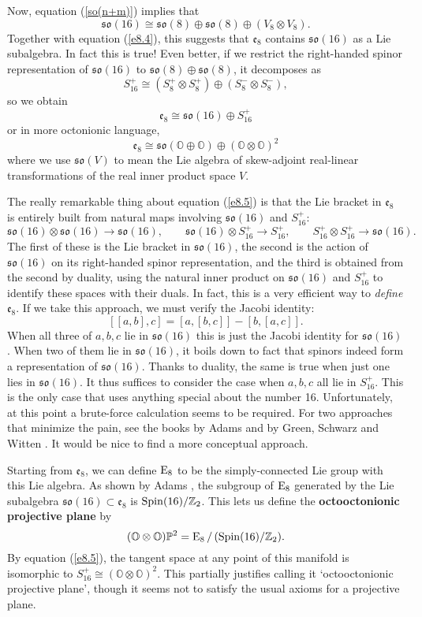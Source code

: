 \documentclass[12pt]{article}
\newcommand\Z{{\mathbb Z}}
\renewcommand\O{{\mathbb O}}
\renewcommand\P{{\mathbb P}}
\newcommand{\Spin}{{\rm Spin}}
\newcommand{\E}{{\rm E}}
\newcommand{\so}{{\mathfrak {so}}}
\newcommand{\e}{{\mathfrak {e}}}
\newcommand{\tensor}{\otimes}
\newcommand{\iso}{\cong}
\newcommand{\be}{\begin{equation}}
\newcommand{\ee}{\end{equation}}
\begin{document}
Now, equation (\ref{so(n+m)}) implies that
\[     \so(16) \iso \so(8) \oplus \so(8) \oplus (V_8 \tensor V_8) .\]
Together with equation (\ref{e8.4}), this suggests that $\e_8$ contains
$\so(16)$ as a Lie subalgebra. In fact this is true!  Even better, if we
restrict the right-handed spinor representation of $\so(16)$ to $\so(8)
\oplus \so(8)$, it decomposes as
\[    S^+_{16} \iso (S_8^+ \tensor S_8^+) \oplus (S_8^- \tensor S_8^-),\]
so we obtain
\be   \e_8 \iso \so(16) \oplus S^+_{16}     \label{e8.5} \ee   
or in more octonionic language,
\[   
\e_8 \iso \so(\O \oplus \O) \oplus (\O \otimes \O)^2 
\label{e8.6} \]   
where we use $\so(V)$ to mean the Lie algebra of skew-adjoint real-linear
transformations of the real inner product space $V$.  

The really remarkable thing about equation (\ref{e8.5}) is that the Lie
bracket in $\e_8$ is entirely built from natural maps involving
$\so(16)$ and $S^+_{16}$:  
\[         \so(16) \tensor \so(16) \to \so(16) , \qquad   
           \so(16) \tensor S^+_{16} \to S^+_{16}  , \qquad   
           S^+_{16} \tensor S^+_{16} \to \so(16) .\]   
The first of these is the Lie bracket in $\so(16)$, the second is the
action of $\so(16)$ on its right-handed spinor representation, and the
third is obtained from the second by duality, using the natural inner
product on $\so(16)$ and $S^+_{16}$ to identify these spaces with their
duals.   In fact, this is a very efficient way to {\it define} $\e_8$. 
If we take this approach, we must verify the Jacobi identity:   
\[       [[a,b],c] = [a,[b,c]] - [b,[a,c]]  .\]   
When all three of $a,b,c$ lie in $\so(16)$ this is just the Jacobi   
identity for $\so(16)$.   When two of them lie in $\so(16)$, it boils   
down to fact that spinors indeed form a representation of $\so(16)$.   
Thanks to duality, the same is true when just one lies in $\so(16)$.  It
thus suffices to consider the case when $a,b,c$ all lie in $S_{16}^+$. 
This is the only case that uses anything special about the number 16. 
Unfortunately, at this point a brute-force calculation seems to be
required.  For two approaches that minimize the pain, see the books by
Adams \cite{Adams} and by Green, Schwarz and Witten \cite{GSW}.   It
would be nice to find a more conceptual approach.
   
Starting from $\e_8$, we can define $\E_8$ to be the simply-connected
Lie group with this Lie algebra.  As shown by Adams \cite{Adams}, the 
subgroup of $\E_8$ generated by the Lie subalgebra $\so(16) \subset
\e_8$ is $\Spin(16)/\Z_2$.  This lets us define the {\bf octooctonionic
projective plane} by  
\[            (\O \tensor \O)\P^2 = \E_8\,/\,(\Spin(16)/\Z_2) . \]  
By equation (\ref{e8.5}), the tangent space at any point 
of this manifold is isomorphic to $S_{16}^+ \iso (\O \tensor \O)^2$.
This partially justifies calling it `octooctonionic projective plane',
though it seems not to satisfy the usual axioms for a projective plane.
\end{document}
